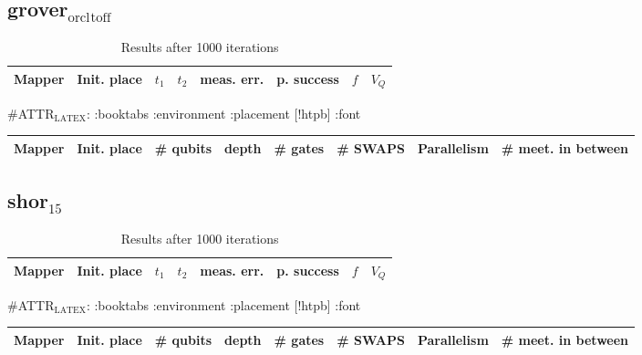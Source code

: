 \documentclass[11pt]{article}
\begin{document}
\subsection{grover\(_{\text{orcl}}\)\(_{\text{toff}}\)}
\label{sec:orgaccb9f1}
\begin{table}[!htpb]
\caption{\label{tab:org55a1cbb}
Results after 1000 iterations}
\centering
\begin{tabular}{llllllll}
\hline
Mapper & Init. place & \(t_1\) & \(t_2\) & meas. err. & p. success & \(f\) & \(V_Q\)\\
\hline
\end{tabular}
\end{table}

\#ATTR\(_{\text{LATEX}}\): :booktabs :environment :placement [!htpb] :font \small
\begin{center}
\begin{tabular}{llllllll}
\hline
Mapper & Init. place & \# qubits & depth & \# gates & \# SWAPS & Parallelism & \# meet. in between\\
\hline
\end{tabular}
\end{center}
\subsection{shor\(_{\text{15}}\)}
\label{sec:orgb39a0a8}
\begin{table}[!htpb]
\caption{\label{tab:org3701a2f}
Results after 1000 iterations}
\centering
\begin{tabular}{llllllll}
\hline
Mapper & Init. place & \(t_1\) & \(t_2\) & meas. err. & p. success & \(f\) & \(V_Q\)\\
\hline
\end{tabular}
\end{table}

\#ATTR\(_{\text{LATEX}}\): :booktabs :environment :placement [!htpb] :font \small
\begin{center}
\begin{tabular}{llllllll}
\hline
Mapper & Init. place & \# qubits & depth & \# gates & \# SWAPS & Parallelism & \# meet. in between\\
\hline
\end{tabular}
\end{center}
\end{document}
